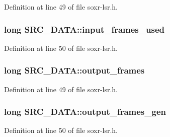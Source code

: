 Definition at line 49 of file soxr-\/lsr.\+h.

\subsubsection[{\texorpdfstring{input\+\_\+frames\+\_\+used}{input_frames_used}}]{\setlength{\rightskip}{0pt plus 5cm}long S\+R\+C\+\_\+\+D\+A\+T\+A\+::input\+\_\+frames\+\_\+used}\hypertarget{struct_s_r_c___d_a_t_a_accc338b0c6ec1074614dc4907fcc3bb1}{}\label{struct_s_r_c___d_a_t_a_accc338b0c6ec1074614dc4907fcc3bb1}


Definition at line 50 of file soxr-\/lsr.\+h.

\subsubsection[{\texorpdfstring{output\+\_\+frames}{output_frames}}]{\setlength{\rightskip}{0pt plus 5cm}long S\+R\+C\+\_\+\+D\+A\+T\+A\+::output\+\_\+frames}\hypertarget{struct_s_r_c___d_a_t_a_abfaea2234191264ea58b4a19da4fe8c3}{}\label{struct_s_r_c___d_a_t_a_abfaea2234191264ea58b4a19da4fe8c3}


Definition at line 49 of file soxr-\/lsr.\+h.

\subsubsection[{\texorpdfstring{output\+\_\+frames\+\_\+gen}{output_frames_gen}}]{\setlength{\rightskip}{0pt plus 5cm}long S\+R\+C\+\_\+\+D\+A\+T\+A\+::output\+\_\+frames\+\_\+gen}\hypertarget{struct_s_r_c___d_a_t_a_a86f13e5d832a6f2bf2ec451097b2c7f2}{}\label{struct_s_r_c___d_a_t_a_a86f13e5d832a6f2bf2ec451097b2c7f2}


Definition at line 50 of file soxr-\/lsr.\+h.

